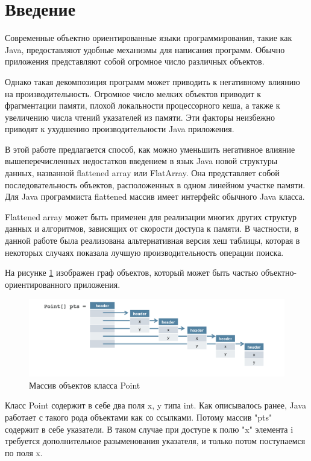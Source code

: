\section{Введение}
Современные объектно ориентированные языки программирования, такие как Java, предоставляют удобные механизмы для написания программ. Обычно приложения представляют собой огромное число различных объектов. 
\par
Однако такая декомпозиция программ может приводить к негативному влиянию на производительность. Огромное число мелких объектов приводит к фрагментации памяти, плохой локальности процессорного кеша, а также к увеличению числа чтений указателей из памяти. Эти факторы неизбежно приводят к ухудшению производительности Java приложения.
\par
В этой работе предлагается способ, как можно уменьшить негативное влияние вышеперечисленных недостатков введением в язык Java новой структуры данных, названной flattened array или FlatArray. Она представляет собой последовательность объектов, расположенных в одном линейном участке памяти. 
Для Java программиста flattened массив имеет интерфейс обычного Java класса.
\par
Flattened array может быть применен для реализации многих других структур данных и алгоритмов, зависящих от скорости доступа к памяти. В частности, в данной работе была реализована альтернативная версия хеш таблицы, которая в некоторых случаях показала лучшую производительность операции поиска.
\par
На рисунке \ref{ref-graph} изображен граф объектов, который может быть частью объектно-ориентированного приложения.
\begin{figure}[h]
	\caption{Массив объектов класса Point}\label{ref-graph}
	\includegraphics[width=0.95\linewidth]{image/reference.png}
\end{figure}
Класс Point содержит в себе два поля x, y типа int. Как описывалось ранее, Java работает с 
такого рода объектами как со ссылками. Потому массив "pts" содержит в себе указатели. В таком случае при доступе к полю "x" элемента i требуется дополнительное разыменования указателя, и только потом поступаемся по поля x.

